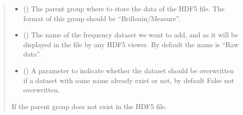 \documentclass[letterpaper,10pt,english]{sphinxmanual}
\begin{document}
\begin{fulllineitems}
\begin{fulllineitems}
\begin{quote}
\begin{description}
\begin{itemize}
\item {} 
\sphinxAtStartPar
{} (\sphinxstyleliteralemphasis{\sphinxupquote{, }}) \textendash{} The parent group where to store the data of the HDF5 file. The format of this group should be “Brillouin/Measure”.

\item {} 
\sphinxAtStartPar
{} (\sphinxstyleliteralemphasis{\sphinxupquote{, }}) \textendash{} The name of the frequency dataset we want to add, and as it will be displayed in the file by any HDF5 viewer. By default the name is “Raw data”.

\item {} 
\sphinxAtStartPar
{} (\sphinxstyleliteralemphasis{\sphinxupquote{, }}) \textendash{} A parameter to indicate whether the dataset should be overwritten if a dataset with same name already exist or not, by default False \sphinxhyphen{} not overwritten.

\end{itemize}

\sphinxAtStartPar
{\hyperref[\detokenize{source/_autosummary/HDF5_BLS.errors:HDF5_BLS.errors.WrapperError_StructureError}]{}} \textendash{} If the parent group does not exist in the HDF5 file.

\end{description}\end{quote}

\end{fulllineitems}



\end{fulllineitems}
\end{document}
